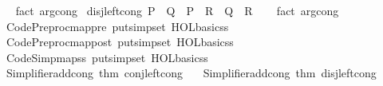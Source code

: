 \begin{isabellebody}
%
\isadelimproof
\ \ %
\endisadelimproof
%
\isatagproof
{}\isamarkupfalse%
\ {\isacharparenleft}{\kern0pt}fact\ arg{\isacharunderscore}{\kern0pt}cong{\isacharparenright}{\kern0pt}%
\endisatagproof
{\isafoldproof}%
%
\isadelimproof
\isanewline
%
\endisadelimproof
\isanewline
{}\isamarkupfalse%
\ disj{\isacharunderscore}{\kern0pt}left{\isacharunderscore}{\kern0pt}cong{\isacharcolon}{\kern0pt}\ {\isachardoublequoteopen}P\ {\isasymlongleftrightarrow}\ Q\ {\isasymLongrightarrow}\ P\ {\isasymor}\ R\ {\isasymlongleftrightarrow}\ Q\ {\isasymor}\ R{\isachardoublequoteclose}\isanewline
%
\isadelimproof
\ \ %
\endisadelimproof
%
\isatagproof
{}\isamarkupfalse%
\ {\isacharparenleft}{\kern0pt}fact\ arg{\isacharunderscore}{\kern0pt}cong{\isacharparenright}{\kern0pt}%
\endisatagproof
{\isafoldproof}%
%
\isadelimproof
\isanewline
%
\endisadelimproof
%
\isadelimML
\isanewline
%
\endisadelimML
%
\isatagML
{}\isamarkupfalse%
\ {\isacartoucheopen}\isanewline
\ \ Code{\isacharunderscore}{\kern0pt}Preproc{\isachardot}{\kern0pt}map{\isacharunderscore}{\kern0pt}pre\ {\isacharparenleft}{\kern0pt}put{\isacharunderscore}{\kern0pt}simpset\ HOL{\isacharunderscore}{\kern0pt}basic{\isacharunderscore}{\kern0pt}ss{\isacharparenright}{\kern0pt}\ {\isacharhash}{\kern0pt}{\isachargreater}{\kern0pt}\isanewline
\ \ Code{\isacharunderscore}{\kern0pt}Preproc{\isachardot}{\kern0pt}map{\isacharunderscore}{\kern0pt}post\ {\isacharparenleft}{\kern0pt}put{\isacharunderscore}{\kern0pt}simpset\ HOL{\isacharunderscore}{\kern0pt}basic{\isacharunderscore}{\kern0pt}ss{\isacharparenright}{\kern0pt}\ {\isacharhash}{\kern0pt}{\isachargreater}{\kern0pt}\isanewline
\ \ Code{\isacharunderscore}{\kern0pt}Simp{\isachardot}{\kern0pt}map{\isacharunderscore}{\kern0pt}ss\ {\isacharparenleft}{\kern0pt}put{\isacharunderscore}{\kern0pt}simpset\ HOL{\isacharunderscore}{\kern0pt}basic{\isacharunderscore}{\kern0pt}ss\ {\isacharhash}{\kern0pt}{\isachargreater}{\kern0pt}\isanewline
\ \ Simplifier{\isachardot}{\kern0pt}add{\isacharunderscore}{\kern0pt}cong\ {\isacharat}{\kern0pt}{\isacharbraceleft}{\kern0pt}thm\ conj{\isacharunderscore}{\kern0pt}left{\isacharunderscore}{\kern0pt}cong{\isacharbraceright}{\kern0pt}\ {\isacharhash}{\kern0pt}{\isachargreater}{\kern0pt}\isanewline
\ \ Simplifier{\isachardot}{\kern0pt}add{\isacharunderscore}{\kern0pt}cong\ {\isacharat}{\kern0pt}{\isacharbraceleft}{\kern0pt}thm\ disj{\isacharunderscore}{\kern0pt}left{\isacharunderscore}{\kern0pt}cong{\isacharbraceright}{\kern0pt}{\isacharparenright}{\kern0pt}\isanewline
{\isacartoucheclose}%

\end{isabellebody}
